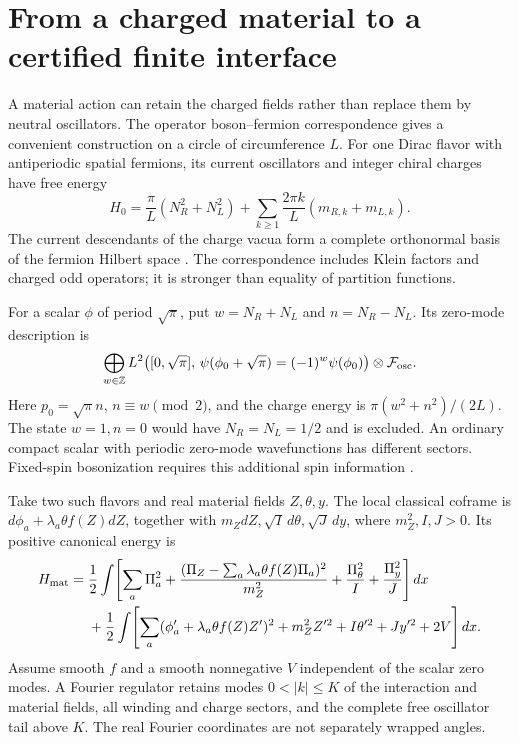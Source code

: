 
\section{From a charged material to a certified finite interface}
\label{sec:charged-material}

A material action can retain the charged fields rather than replace
them by neutral oscillators. The operator boson--fermion correspondence
gives a convenient construction on a circle of circumference $L$.
For one Dirac flavor with antiperiodic spatial fermions, its current
oscillators and integer chiral charges have free energy
\[
 H_0=\frac\pi L(N_R^2+N_L^2)
       +\sum_{k\ge1}\frac{2\pi k}{L}(m_{R,k}+m_{L,k}).
\]
The current descendants of the charge vacua form a complete
orthonormal basis of the fermion Hilbert space
\cite[Sections~2.5--2.6]{LangmannMoosavi2015}.
The correspondence includes Klein factors and charged odd operators;
it is stronger than equality of partition functions.

For a scalar $\phi$ of period $\sqrt\pi$, put
$w=N_R+N_L$ and $n=N_R-N_L$. Its zero-mode description is
\[
 \bigoplus_{w\in\mathbb Z}
 L^2\!\left([0,\sqrt\pi],\,
       \psi(\phi_0+\sqrt\pi)=(-1)^w\psi(\phi_0)\right)
       \otimes\mathcal F_{\rm osc}.
\]
Here $p_0=\sqrt\pi n$, $n\equiv w\pmod2$, and the charge
energy is $\pi(w^2+n^2)/(2L)$. The state $w=1,n=0$ would have
$N_R=N_L=1/2$ and is excluded. An ordinary compact scalar with
periodic zero-mode wavefunctions has different sectors. Fixed-spin
bosonization requires this additional spin information
\cite[Section~3.5]{KarchTongTurner2019}.

Take two such flavors and real material fields $Z,\theta,y$.
The local classical coframe is
$d\phi_a+\lambda_a\theta f(Z)dZ$, together with
$m_ZdZ,\sqrt I\,d\theta,\sqrt J\,dy$, where
$m_Z^2,I,J>0$. Its positive canonical energy is
\begin{align*}
 H_{\rm mat}={}&\frac12\int\!\left[
 \sum_a\Pi_a^2+
 \frac{(\Pi_Z-\sum_a\lambda_a\theta f(Z)\Pi_a)^2}{m_Z^2}
 +\frac{\Pi_\theta^2}{I}+\frac{\Pi_y^2}{J}\right]dx\\
 &+\frac12\int\!\left[
 \sum_a(\phi_a'+\lambda_a\theta f(Z)Z')^2
 +m_Z^2Z'^2+I\theta'^2+Jy'^2+2V\right]dx .
\end{align*}
Assume smooth $f$ and a smooth nonnegative $V$ independent of
the scalar zero modes. A Fourier regulator retains modes
$0<|k|\le K$ of the interaction and material fields, all winding
and charge sectors, and the complete free oscillator tail above $K$.
The real Fourier coordinates are not separately wrapped angles.

